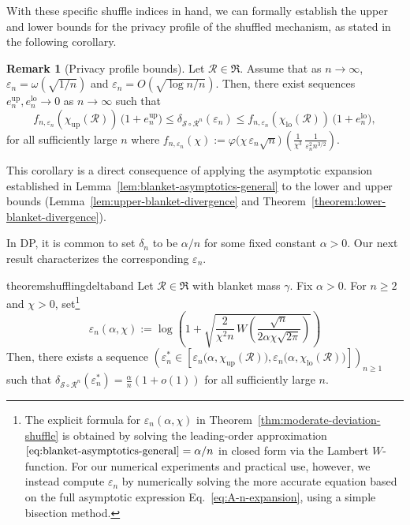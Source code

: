 \documentclass{article}
\theoremstyle{plain}
\theoremstyle{definition}
\newtheorem{corollary}[theorem]{Remark}
\begin{document}
With these specific shuffle indices in hand, we can formally establish the upper and lower bounds for the privacy profile of the shuffled mechanism, as stated in the following corollary.

\begin{corollary}[Privacy profile bounds]
\label{lem:shuffle-index-profile-seq-no-t}
Let $\mathcal R\in \mathfrak R$.
Assume that as $n\to\infty$,
$
\varepsilon_n=\omega(\sqrt{1/n})
$
and
$
\varepsilon_n=O\!\left(\sqrt{\log n/n}\right).
$
Then, there exist sequences
$e_n^{\mathrm{up}},e_n^{\mathrm{lo}}\to 0$ as $n\to\infty$ such that
\[
  f_{n,\varepsilon_n}(\chi_{\mathrm{up}}(\mathcal R))\,\bigl(1+e_n^{\mathrm{up}}\bigr)
  \le
  \delta_{\mathcal S\circ \mathcal R^n}(\varepsilon_n)
  \le
  f_{n,\varepsilon_n}(\chi_{\mathrm{lo}}(\mathcal R))\,\bigl(1+e_n^{\mathrm{lo}}\bigr),
\]
for all sufficiently large $n$ where
$
  f_{n,\varepsilon_n}(\chi)
  :=
  \varphi\bigl(\chi\,\varepsilon_n\sqrt{n}\bigr)\,
  \left(
    \frac{1}{\chi^3}\,
    \frac{1}{\varepsilon_n^2 n^{3/2}}
  \right).
$
\end{corollary}


 
This corollary is a direct consequence of applying the asymptotic expansion established in Lemma~\ref{lem:blanket-asymptotics-general} to the lower and upper bounds (Lemma~\ref{lem:upper-blanket-divergence} and Theorem~\ref{theorem:lower-blanket-divergence}).


In DP, it is common to set $\delta_n$ to be $\alpha/n$ for some fixed constant $\alpha>0$.
Our next result characterizes the corresponding $\varepsilon_n$.

\begin{restatable}{theorem}{shufflingdeltaband}
\label{thm:moderate-deviation-shuffle}
Let $\mathcal{R}\in\mathfrak{R}$ with blanket mass $\gamma$.
Fix $\alpha>0$. For $n\ge2$ and $\chi>0$, set\footnote{%
The explicit formula for $\varepsilon_n(\alpha,\chi)$ in
Theorem~\ref{thm:moderate-deviation-shuffle} is obtained by solving the
leading-order approximation $\eqref{eq:blanket-asymptotics-general}=\alpha/n$ in closed form via the Lambert $W$-function.
For our numerical experiments and practical use, however, we instead
compute $\varepsilon_n$ by numerically solving the more accurate equation based on the full asymptotic expression Eq.~\eqref{eq:A-n-expansion}, using a simple bisection method.
}
\begin{equation}
  \label{eq:asymptoptic_epsilon}
  \varepsilon_n(\alpha,\chi)
  := \log\left(
      1
      +\sqrt{\frac{2}{\chi^2 n}\,
              W\!\left(
                \frac{\sqrt{n}}{2\alpha\chi\sqrt{2\pi}}
              \right)}
    \right)
\end{equation}
Then, there exists a sequence
$(\varepsilon^\ast_n\in [\varepsilon_n\bigl(\alpha,\chi_{\mathrm{up}}(\mathcal{R})\bigr),
  \varepsilon_n\bigl(\alpha,\chi_{\mathrm{lo}}(\mathcal{R})\bigr)])_{n\ge1}$ such that
$
  \delta_{\mathcal{S}\circ\mathcal{R}^n}(\varepsilon^\ast_n)=\frac{\alpha}{n}(1+o(1))
$ for all sufficiently large $n$.
\end{restatable}
\end{document}
